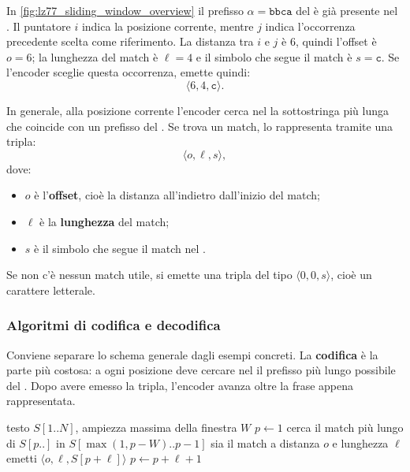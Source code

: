 \documentclass{article}
\theoremstyle{definition}
\numberwithin{equation}{section}
\begin{document}
In \autoref{fig:lz77_sliding_window_overview} il prefisso
$\alpha=\texttt{bbca}$ del  è già presente nel
. Il puntatore $i$ indica la posizione corrente,
mentre $j$ indica l'occorrenza precedente scelta come riferimento. La
distanza tra $i$ e $j$ è $6$, quindi l'offset è $o=6$; la lunghezza del
match è $\ell=4$ e il simbolo che segue il match è $s=\texttt{c}$. Se
l'encoder sceglie questa occorrenza, emette quindi:
\[
    \langle 6,4,\texttt{c}\rangle.
\]

In generale, alla posizione corrente l'encoder cerca nel  la sottostringa più lunga che coincide con un prefisso del . Se trova un match, lo rappresenta tramite una tripla:
\[
    \langle o,\ell,s\rangle,
\]
dove:
\begin{itemize}
    \item $o$ è l'\textbf{offset}, cioè la distanza all'indietro dall'inizio del match;
    \item $\ell$ è la \textbf{lunghezza} del match;
    \item $s$ è il simbolo che segue il match nel .
\end{itemize}
Se non c'è nessun match utile, si emette una tripla del tipo $\langle 0,0,s\rangle$, cioè un carattere letterale.

\subsubsection{Algoritmi di codifica e decodifica}
Conviene separare lo schema generale dagli esempi concreti. La
\textbf{codifica} è la parte più costosa: a ogni posizione deve cercare
nel  il prefisso più lungo possibile del
. Dopo avere emesso la tripla, l'encoder avanza
oltre la frase appena rappresentata.

\begin{algorithm}[H]
    \caption{Schema di codifica LZ77}
    \begin{algorithmic}[1]
        \Require testo $S[1..N]$, ampiezza massima della finestra $W$
        \State $p\gets 1$
        \State cerca il match più lungo di $S[p..]$ in $S[\max(1,p-W)..p-1]$
        \State sia il match a distanza $o$ e lunghezza $\ell$
        \State emetti $\langle o,\ell,S[p+\ell]\rangle$
        \State $p\gets p+\ell+1$
        \EndWhile
    \end{algorithmic}
    \label{alg:lz77_encoding}
\end{algorithm}
\end{document}
